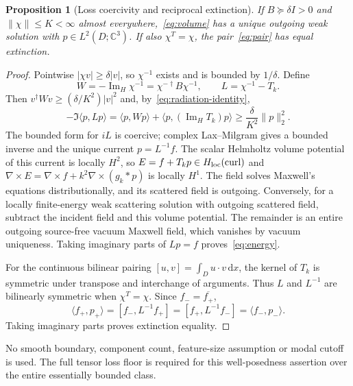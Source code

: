 \documentclass[11pt]{article}
\newtheorem{proposition}[theorem]{Proposition}
\newcommand{\ImH}{\operatorname{Im}_{\!H}}
\newcommand{\dd}{\,\mathrm{d}}
\newcommand{\ip}[2]{\langle #1,#2\rangle}
\newcommand{\bilin}[2]{[#1,#2]}
\newcommand{\norm}[1]{\lVert #1\rVert}
\newcommand{\abs}[1]{\lvert #1\rvert}
\begin{document}
\begin{proposition}[Loss coercivity and reciprocal extinction]\label{prop:coercivity}
If $B\succeq\delta I>0$ and $\norm\chi\leq K<\infty$ almost everywhere,~\eqref{eq:volume} has a unique outgoing weak solution with $p\in L^2(D;\mathbb C^3)$. If also $\chi^T=\chi$, the pair~\eqref{eq:pair} has equal extinction.
\end{proposition}
\begin{proof}
Pointwise $\abs{\chi v}\geq\delta\abs v$, so $\chi^{-1}$ exists and is bounded by $1/\delta$. Define
\[
 W=-\ImH\chi^{-1}=\chi^{-\dagger}B\chi^{-1},\qquad L=\chi^{-1}-T_k.
\]
Then $v^\dagger Wv\geq(\delta/K^2)\abs v^2$ and, by~\eqref{eq:radiation-identity},
\[
 -\Im\ip p{Lp}=\ip p{Wp}+\ip p{(\ImH T_k)p}
 \geq\frac{\delta}{K^2}\norm p_2^2.
\]
The bounded form for $iL$ is coercive; complex Lax--Milgram gives a bounded inverse and the unique current $p=L^{-1}f$. The scalar Helmholtz volume potential of this current is locally $H^2$, so $E=f+T_kp\in H_{\rm loc}(\operatorname{curl})$ and $\nabla\times E=\nabla\times f+k^2\nabla\times(g_k*p)$ is locally $H^1$. The field solves Maxwell's equations distributionally, and its scattered field is outgoing. Conversely, for a locally finite-energy weak scattering solution with outgoing scattered field, subtract the incident field and this volume potential. The remainder is an entire outgoing source-free vacuum Maxwell field, which vanishes by vacuum uniqueness. Taking imaginary parts of $Lp=f$ proves~\eqref{eq:energy}.

For the continuous bilinear pairing $\bilin uv=\int_Du\cdot v\dd x$, the kernel of $T_k$ is symmetric under transpose and interchange of arguments. Thus $L$ and $L^{-1}$ are bilinearly symmetric when $\chi^T=\chi$. Since $f_-=\overline{f_+}$,
\[
 \ip{f_+}{p_+}=\bilin{f_-}{L^{-1}f_+}
 =\bilin{f_+}{L^{-1}f_-}=\ip{f_-}{p_-}.
\]
Taking imaginary parts proves extinction equality.
\end{proof}
No smooth boundary, component count, feature-size assumption or modal cutoff is used. The full tensor loss floor is required for this well-posedness assertion over the entire essentially bounded class.
\end{document}
